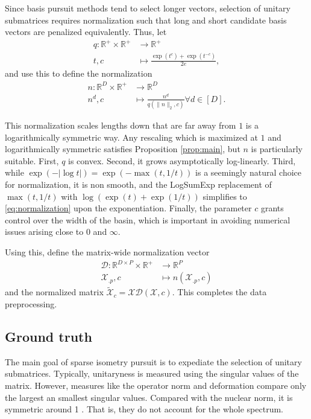 \documentclass[a4paper,11pt]{article}
\begin{document}
Since basis pursuit methods tend to select longer vectors, selection of unitary submatrices requires normalization such that long and short candidate basis vectors are penalized equivalently.
Thus, let
\begin{align}
\label{eq:normalization}
q: \mathbb R^+ \times \mathbb R^+  &\to \mathbb R^+ \\
t , c &\mapsto \frac{\exp(t^c) + \exp(t^{-c})}{2e},
\end{align}
and use this to define the normalization 
\begin{align}
n: \mathbb R^D \times \mathbb R^+ &\to \mathbb R^D \\
n^d , c &\mapsto \frac{n^d}{q(\|n\|_{2},c) } \forall d \in [D].
\end{align}

This normalization scales lengths down that are far away from $1$ is a logarithmically symmetric way.
Any rescaling which is maximized at $1$ and logarithmically symmetric satisfies Proposition \ref{prop:main}, but $n$ is particularly suitable.
First, $q$ is convex.
Second, it grows asymptotically log-linearly.
Third, while $\exp(-|\log t|) = \exp(-\max (t, 1/t))$ is a seemingly natural choice for normalization, it is non smooth, and the LogSumExp replacement of $\max (t, 1/t)$ with $ \log (\exp (t ) + \exp(1/t))$ simplifies to \ref{eq:normalization} upon the exponentiation.
Finally, the parameter $c$ grants control over the width of the basin, which is important in avoiding numerical issues arising close to $0$ and $\infty$.

Using this, define the matrix-wide normalization vector
\begin{align}
\mathcal D: \mathbb R^{D \times P} \times \mathbb R^+ &\to \mathbb R^P \\
\mathcal X_{.p}, c &\mapsto n(\mathcal X_{.p}, c)
\end{align}
and the normalized matrix $\tilde {\mathcal X}_c = \mathcal X \mathcal D(\mathcal X, c).$
This completes the data preprocessing.

\subsection{Ground truth}

The main goal of sparse isometry pursuit is to expediate the selection of unitary submatrices.
Typically, unitaryness is measured using the singular values of the matrix.
However, measures like the operator norm and deformation compare only the largest an smallest singular values.
Compared with the nuclear norm, it is symmetric around 1 \cite{Fazel2001ARM}. %
That is, they do not account for the whole spectrum.
\end{document}
